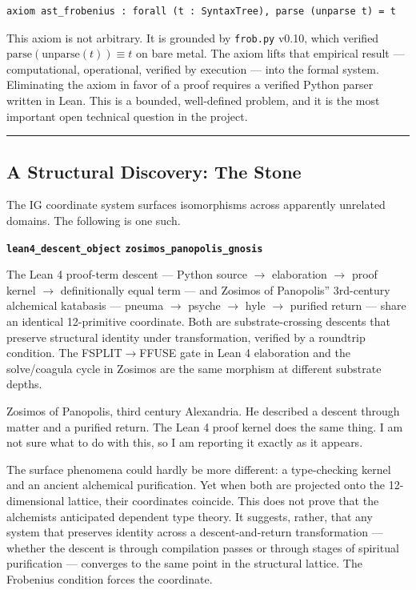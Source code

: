 \documentclass[12pt,a4paper]{article}
\begin{document}
\begin{lstlisting}[language=lean]
axiom ast_frobenius : forall (t : SyntaxTree), parse (unparse t) = t
\end{lstlisting}

This axiom is not arbitrary. It is grounded by \texttt{frob.py} v0.10, which verified $\text{parse}(\text{unparse}(t)) \equiv t$ on bare metal. The axiom lifts that empirical result --- computational, operational, verified by execution --- into the formal system. Eliminating the axiom in favor of a proof requires a verified Python parser written in Lean. This is a bounded, well-defined problem, and it is the most important open technical question in the project.

\begin{center}
\rule{0.5\textwidth}{0.4pt}
\end{center}

\subsection{A Structural Discovery: The Stone}

The IG coordinate system surfaces isomorphisms across apparently unrelated domains. The following is one such.

\textbf{\texttt{lean4\_descent\_object} \equiv \texttt{zosimos\_panopolis\_gnosis}}

The Lean 4 proof-term descent --- Python source $\rightarrow$ elaboration $\rightarrow$ proof kernel $\rightarrow$ definitionally equal term --- and Zosimos of Panopolis'' 3rd-century alchemical katabasis --- pneuma $\rightarrow$ psyche $\rightarrow$ hyle $\rightarrow$ purified return --- share an identical 12-primitive coordinate. Both are substrate-crossing descents that preserve structural identity under transformation, verified by a roundtrip condition. The FSPLIT$\rightarrow$FFUSE gate in Lean 4 elaboration and the solve/coagula cycle in Zosimos are the same morphism at different substrate depths.

Zosimos of Panopolis, third century Alexandria. He described a descent through matter and a purified return. The Lean 4 proof kernel does the same thing. I am not sure what to do with this, so I am reporting it exactly as it appears.

The surface phenomena could hardly be more different: a type-checking kernel and an ancient alchemical purification. Yet when both are projected onto the 12-dimensional lattice, their coordinates coincide. This does not prove that the alchemists anticipated dependent type theory. It suggests, rather, that any system that preserves identity across a descent-and-return transformation --- whether the descent is through compilation passes or through stages of spiritual purification --- converges to the same point in the structural lattice. The Frobenius condition forces the coordinate.
\end{document}
